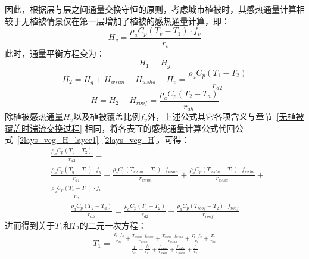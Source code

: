因此，根据层与层之间通量交换守恒的原则，考虑城市植被时，其感热通量计算相较于无植被情景仅在第一层增加了植被的感热通量计算，即：
\begin{equation}
    H_{v} = \frac{\rho _a C_p \left( T_{v} - T_{1} \right) \cdot f_v}{r_{v}}
\end{equation}
此时，通量平衡方程变为：
\begin{equation}\label{2lays_veg_H_layer1}
    H_{1} = H_{g}
\end{equation}
%
\begin{equation}\label{2lays_veg_H_layer2}
    H_{2} = H_{g} + H_{wsun} + H_{wsha} + H_{v} = \frac{\rho _a C_p \left( T_{1} - T_{2} \right)}{r_{d2}}
\end{equation}
%
\begin{equation}\label{2lays_veg_H}
    H = H_{2} + H_{roof} = \frac{\rho _a C_p \left( T_{2} - T_a \right)}{r_{ah}}
\end{equation}
除植被感热通量$H_v$以及植被覆盖比例$f_v$外，上述公式其它各项含义与章节~\ref{无植被覆盖时湍流交换过程} 相同，将各表面的感热通量计算公式代回公式~\eqref{2lays_veg_H_layer1}--\eqref{2lays_veg_H}，可得：
\begin{equation}
    \begin{split}
        & \frac{\rho _a C_p \left( T_{1} - T_{2} \right)}{r_{d2}} = \\
        & \frac{\rho _a C_p \left( T_{g} - T_{1} \right) \cdot f_{g}}{r_{d1}} + \frac{\rho _a C_p \left( T_{wsun} - T_{1} \right) \cdot f_{wsun}}{r_{wsun}} + \frac{\rho _a C_p \left( T_{wsha} - T_{1} \right) \cdot f_{wsha}}{r_{wsha}} + 
        \\ 
        & \frac{\rho _a C_p \left( T_{v} - T_{1} \right) \cdot f_v}{r_{v}}
    \end{split}
\end{equation}
%
\begin{equation}
    \begin{split}
        \frac{\rho _a C_p \left( T_{2} - T_a \right)}{r_{ah}} = 
        \frac{\rho _a C_p \left( T_{1} - T_{2} \right)}{r_{d2}} + \frac{\rho _a C_p \left( T_{roof} - T_{2} \right)\cdot f_{roof}}{r_{roof}}
    \end{split}
\end{equation}
进而得到关于$T_{1}$和$T_{2}$的二元一次方程：
\begin{equation}
    \begin{split}
         T_{1} =
         \frac{\frac{T_{g} \cdot f_{g}}{r_{d1}} + \frac{T_{wsun} \cdot f_{wsun}}{r_{wsun}} + \frac{T_{wsha} \cdot f_{wsha}}{r_{wsha}} + \frac{T_{v} \cdot f_v}{r_{v}} + \frac{T_{2}}{r_{d2}}}{\frac{1}{r_{d2}} + \frac{f_{g}}{r_{d1}} + \frac{f_{wsun}}{r_{wsun}} + \frac{f_{wsha}}{r_{wsha}} + \frac{f_v}{r_{v}}}
    \end{split}
\end{equation}
